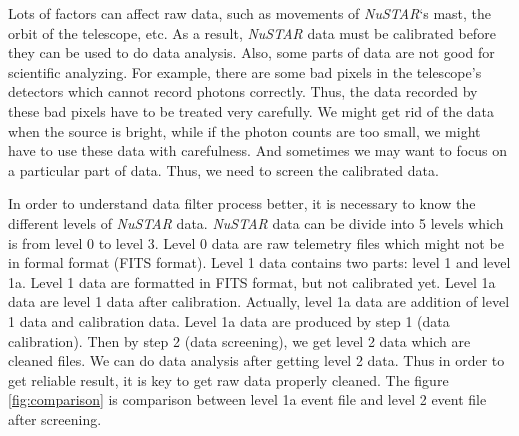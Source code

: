 \documentclass[12pt]{report}
\begin{document}
            \indent 
            Lots of factors can affect raw data, such as movements of \textit{NuSTAR}‘s mast, the orbit of the 
            telescope, 
            etc. As a result, \textit{NuSTAR} data must be calibrated before they can be used to do data analysis. 
            Also, some parts 
            of data are not good for scientific analyzing. For example, there are some bad pixels in the telescope's 
            detectors which cannot record photons correctly. Thus, the data recorded by these bad pixels have to be
            treated very carefully. We might get rid of the data when the source is bright, while if the photon counts
            are too small, we might have to use these data with carefulness. And sometimes we may want to focus on a 
            particular part of data. Thus, we need to screen the calibrated data. 

            \indent 
            In order to understand data filter process better, it is necessary to know the different levels of 
            \textit{NuSTAR} data. 
            \textit{NuSTAR} data can be divide into 5 levels which is from level 0 to level 3. Level 0 data are raw 
            telemetry files
            which might not be in formal format (FITS format). Level 1 data contains two parts: level 1 and level 
            1a. Level 1
            data are formatted in FITS format, but not calibrated yet. Level 1a data are level 1 data after 
            calibration. 
            Actually, level 1a data are addition of level 1 data and calibration data. Level 1a data are produced by 
            step 1 
            (data calibration). Then by step 2 (data screening), we get level 2 data which are cleaned files. We 
            can do data
            analysis after getting level 2 data. Thus in order to get reliable result, it is key to get raw data 
            properly 
            cleaned. The figure \ref{fig:comparison} is comparison between level 1a event file and level 2 event file 
            after screening.  
\end{document}
